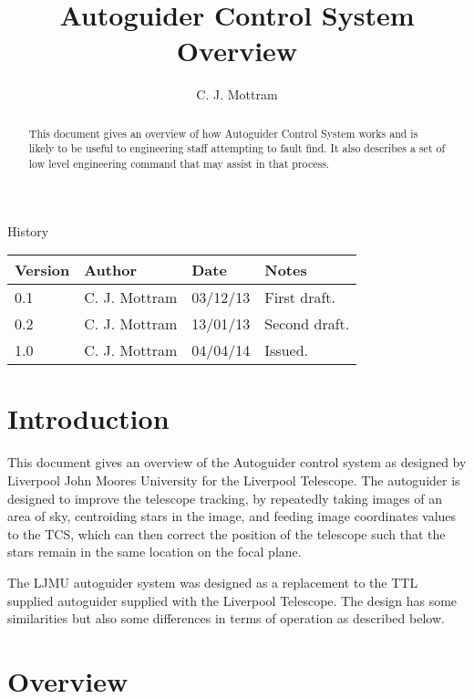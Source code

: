 \documentclass[10pt,a4paper]{article}
\title{Autoguider Control System Overview}
\author{C. J. Mottram}
\date{}
\begin{document}
\thispagestyle{empty}
\maketitle
\begin{abstract}
This document gives an overview of how Autoguider Control System works
and is likely to be useful to engineering staff attempting to fault
find.  It also describes a set of low level engineering command that
may assist in that process.
\end{abstract}
\centerline{\Large History}
\begin{center}
\begin{tabular}{|l|l|l|p{15em}|}
\hline
{\bf Version} & {\bf Author} & {\bf Date} & {\bf Notes} \\
\hline
0.1 & C. J. Mottram & 03/12/13 & First draft. \\
0.2 & C. J. Mottram & 13/01/13 & Second draft. \\
1.0 & C. J. Mottram & 04/04/14 & Issued. \\
\hline
\end{tabular}
\end{center}

\newpage
\tableofcontents
\listoffigures
\listoftables
\newpage

\section{Introduction}
This document gives an overview of the Autoguider control system as designed by Liverpool John Moores University for
the Liverpool Telescope. The autoguider is designed to improve the telescope tracking, by repeatedly taking images of an area of sky, centroiding stars in the image, and feeding image coordinates values to the TCS, which can then correct the position of the telescope such that the stars remain in the same location on the focal plane.

The LJMU autoguider system was designed as a replacement to the TTL supplied autoguider supplied with the Liverpool Telescope. The design has some similarities but also some differences in terms of operation as described below.

\section{Overview}
\end{document}
